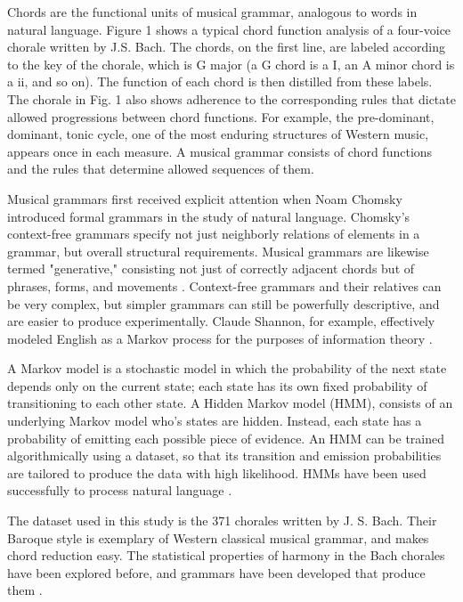 \documentclass[letterpaper]{article}
\begin{document}
Chords are the functional units of musical grammar, analogous to words in natural language. Figure 1 shows a typical chord function analysis of a four-voice chorale written by J.S. Bach. The chords, on the first line, are labeled according to the key of the chorale, which is G major (a G chord is a I, an A minor chord is a ii, and so on). The function of each chord is then distilled from these labels. The chorale in Fig. 1 also shows adherence to the corresponding rules that dictate allowed progressions between chord functions. For example, the pre-dominant, dominant, tonic cycle, one of the most enduring structures of Western music, appears once in each measure. A musical grammar consists of chord functions and the rules that determine allowed sequences of them.

Musical grammars first received explicit attention when Noam Chomsky introduced formal grammars in the study of natural language. Chomsky's context-free grammars specify not just neighborly relations of elements in a grammar, but overall structural requirements. Musical grammars are likewise termed "generative," consisting not just of correctly adjacent chords but of phrases, forms, and movements \cite{rohrmeier2011towards}. Context-free grammars and their relatives can be very complex, but simpler grammars can still be powerfully descriptive, and are easier to produce experimentally. Claude Shannon, for example, effectively modeled English as a Markov process for the purposes of information theory \cite{shannon2001mathematical}.

A Markov model is a stochastic model in which the probability of the next state depends only on the current state; each state has its own fixed probability of transitioning to each other state. A Hidden Markov model (HMM), consists of an underlying Markov model who's states are hidden. Instead, each state has a probability of emitting each possible piece of evidence. An HMM can be trained algorithmically using a dataset, so that its transition and emission probabilities are tailored to produce the data with high likelihood. HMMs have been used successfully to process natural language \cite{saul1997aggregate}.

The dataset used in this study is the 371 chorales written by J. S. Bach. Their Baroque style is exemplary of Western classical musical grammar, and makes chord reduction easy. The statistical properties of harmony in the Bach chorales have been explored before, and grammars have been developed that produce them \cite{baroni1983concept, rohrmeier2008statistical}.
\end{document}
